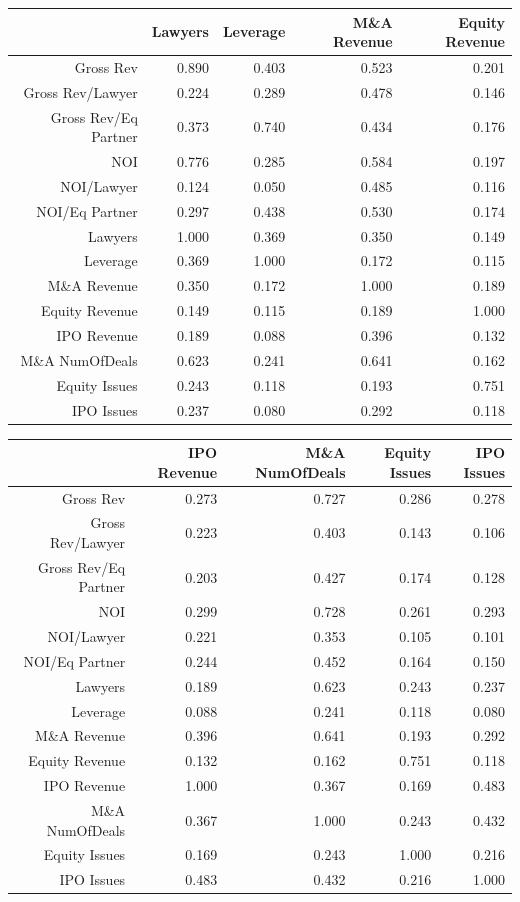 \documentclass{article}
\begin{document}
\begin{table}[H]
\centering
\begin{tabular}{rrrrr}
  \hline
 & Lawyers & Leverage & M\&A Revenue & Equity Revenue \\ 
  \hline
Gross Rev & 0.890 & 0.403 & 0.523 & 0.201 \\ 
  Gross Rev/Lawyer & 0.224 & 0.289 & 0.478 & 0.146 \\ 
  Gross Rev/Eq Partner & 0.373 & 0.740 & 0.434 & 0.176 \\ 
  NOI & 0.776 & 0.285 & 0.584 & 0.197 \\ 
  NOI/Lawyer & 0.124 & 0.050 & 0.485 & 0.116 \\ 
  NOI/Eq Partner & 0.297 & 0.438 & 0.530 & 0.174 \\ 
  Lawyers & 1.000 & 0.369 & 0.350 & 0.149 \\ 
  Leverage & 0.369 & 1.000 & 0.172 & 0.115 \\ 
  M\&A Revenue & 0.350 & 0.172 & 1.000 & 0.189 \\ 
  Equity Revenue & 0.149 & 0.115 & 0.189 & 1.000 \\ 
  IPO Revenue & 0.189 & 0.088 & 0.396 & 0.132 \\ 
  M\&A NumOfDeals & 0.623 & 0.241 & 0.641 & 0.162 \\ 
  Equity Issues & 0.243 & 0.118 & 0.193 & 0.751 \\ 
  IPO Issues & 0.237 & 0.080 & 0.292 & 0.118 \\ 
   \hline
\end{tabular}
\end{table}
\begin{table}[H]
\centering
\begin{tabular}{rrrrr}
  \hline
 & IPO Revenue & M\&A NumOfDeals & Equity Issues & IPO Issues \\ 
  \hline
Gross Rev & 0.273 & 0.727 & 0.286 & 0.278 \\ 
  Gross Rev/Lawyer & 0.223 & 0.403 & 0.143 & 0.106 \\ 
  Gross Rev/Eq Partner & 0.203 & 0.427 & 0.174 & 0.128 \\ 
  NOI & 0.299 & 0.728 & 0.261 & 0.293 \\ 
  NOI/Lawyer & 0.221 & 0.353 & 0.105 & 0.101 \\ 
  NOI/Eq Partner & 0.244 & 0.452 & 0.164 & 0.150 \\ 
  Lawyers & 0.189 & 0.623 & 0.243 & 0.237 \\ 
  Leverage & 0.088 & 0.241 & 0.118 & 0.080 \\ 
  M\&A Revenue & 0.396 & 0.641 & 0.193 & 0.292 \\ 
  Equity Revenue & 0.132 & 0.162 & 0.751 & 0.118 \\ 
  IPO Revenue & 1.000 & 0.367 & 0.169 & 0.483 \\ 
  M\&A NumOfDeals & 0.367 & 1.000 & 0.243 & 0.432 \\ 
  Equity Issues & 0.169 & 0.243 & 1.000 & 0.216 \\ 
  IPO Issues & 0.483 & 0.432 & 0.216 & 1.000 \\ 
   \hline
\end{tabular}
\end{table}
\end{document}
